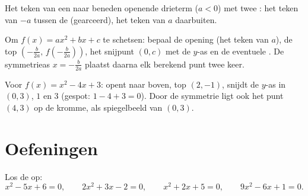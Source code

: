 \begin{omfigure}

{\small Het teken van een naar beneden openende drieterm ($a < 0$) met twee
: het teken van $-a$ tussen de  (gearceerd), het teken van $a$
daarbuiten.}
\end{omfigure}

\begin{method}\label{met:g11:quad:reading}
Om $f(x) = ax^2+bx+c$ te schetsen: bepaal de opening (het teken van $a$), de
top $\left(-\frac{b}{2a},\, f\!\left(-\frac{b}{2a}\right)\right)$, het
snijpunt $(0, c)$ met de $y$-as en de eventuele . De symmetrieas
$x = -\frac{b}{2a}$ plaatst daarna elk berekend punt twee keer.
\end{method}

\begin{example}
Voor $f(x) = x^2 - 4x + 3$: opent naar boven, top $(2, -1)$, snijdt de
$y$-as in $(0,3)$,  $1$ en $3$ (gespot: $1 - 4 + 3 = 0$). Door de
symmetrie ligt ook het punt $(4, 3)$ op de kromme, als spiegelbeeld van
$(0, 3)$.
\end{example}

\section{Oefeningen}

\begin{exercise}[$\star$]\label{exo:g11:quad:1}
Los de  op:
\[
x^2 - 5x + 6 = 0, \qquad
2x^2 + 3x - 2 = 0, \qquad
x^2 + 2x + 5 = 0, \qquad
9x^2 - 6x + 1 = 0 .
\]
\end{exercise}

